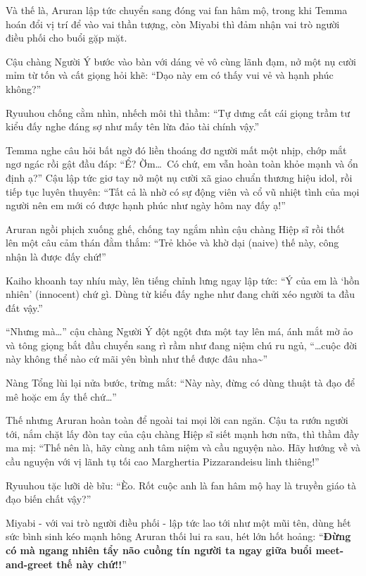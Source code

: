 \documentclass[../main.tex]{subfiles}
\begin{document}
\ct

Và thế là, Aruran lập tức chuyển sang đóng vai fan hâm mộ, trong khi Temma hoán đổi vị trí để vào vai thần tượng, còn Miyabi thì đảm nhận vai trò người điều phối cho buổi gặp mặt.

Cậu chàng Người Ý bước vào bàn với dáng vẻ vô cùng lãnh đạm, nở một nụ cười mỉm từ tốn và cất giọng hỏi khẽ: ``Dạo này em có thấy vui vẻ và hạnh phúc không?''

Ryuuhou chống cằm nhìn, nhếch môi thì thầm: ``Tự dưng cất cái giọng trầm tư kiểu đấy nghe đáng sợ như mấy tên lừa đảo tài chính vậy.''

Temma nghe câu hỏi bất ngờ đó liền thoáng đơ người mất một nhịp, chớp mắt ngơ ngác rồi gật đầu đáp: ``Ể? Ờm\dots\ Có chứ, em vẫn hoàn toàn khỏe mạnh và ổn định ạ?'' Cậu lập tức giơ tay nở một nụ cười xã giao chuẩn thương hiệu idol, rồi tiếp tục luyên thuyên: ``Tất cả là nhờ có sự động viên và cổ vũ nhiệt tình của mọi người nên em mới có được hạnh phúc như ngày hôm nay đấy ạ!''


Aruran ngồi phịch xuống ghế, chống tay ngắm nhìn cậu chàng Hiệp sĩ rồi thốt lên một câu cảm thán đằm thắm: ``Trẻ khỏe và khờ dại (naive) thế này, công nhận là được đấy chứ!''

Kaiho khoanh tay nhíu mày, lên tiếng chỉnh lưng ngay lập tức: ``Ý của em là `hồn nhiên' (innocent) chứ gì. Dùng từ kiểu đấy nghe như đang chửi xéo người ta đầu đất vậy.''

``Nhưng mà\dots'' cậu chàng Người Ý đột ngột đưa một tay lên má, ánh mắt mờ ảo và tông giọng bắt đầu chuyển sang rì rầm như đang niệm chú ru ngủ, ``\dots cuộc đời này không thể nào cứ mãi yên bình như thế được đâu nha\~{}''


Nàng Tổng lùi lại nửa bước, trừng mắt: ``Này này, đừng có dùng thuật tà đạo để mê hoặc em ấy thế chứ\dots''

Thế nhưng Aruran hoàn toàn để ngoài tai mọi lời can ngăn. Cậu ta rướn người tới, nắm chặt lấy đòn tay của cậu chàng Hiệp sĩ siết mạnh hơn nữa, thì thầm đầy ma mị: ``Thế nên là, hãy cùng anh tâm niệm và cầu nguyện nào. Hãy hướng về và cầu nguyện với vị lãnh tụ tối cao Marghertia Pizzarandeisu linh thiêng!''

Ryuuhou tặc lưỡi dè bĩu: ``Èo. Rốt cuộc anh là fan hâm mộ hay là truyền giáo tà đạo biến chất vậy?''

Miyabi - với vai trò người điều phối - lập tức lao tới như một mũi tên, dùng hết sức bình sinh kéo mạnh hông Aruran thối lui ra sau, hét lớn hốt hoảng: ``\textbf{Đừng có mà ngang nhiên tẩy não cuồng tín người ta ngay giữa buổi meet-and-greet thế này chứ!!}''
\end{document}

